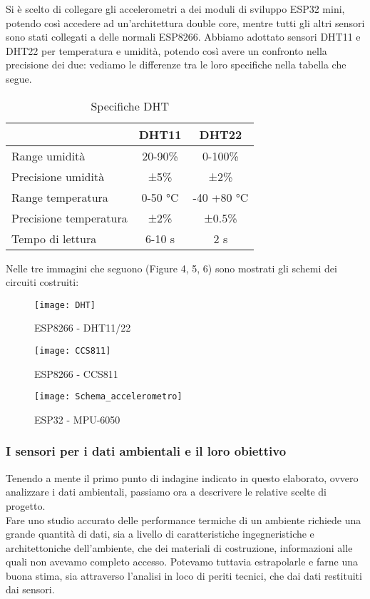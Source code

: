 \documentclass[fleqn,10pt]{SelfArx} %
\begin{document}
Si è scelto di collegare gli accelerometri a dei moduli di sviluppo ESP32 mini, potendo così accedere ad 
un'architettura double core, mentre tutti gli altri sensori sono stati collegati a delle normali ESP8266. 
Abbiamo adottato sensori DHT11 e DHT22 per temperatura e umidità, potendo così avere un confronto nella 
precisione dei due: vediamo le differenze tra le loro specifiche nella tabella che segue.

\begin{table}[hbt]
	\caption{Specifiche DHT}
	\centering
	\begin{tabular}{lcc}
		\toprule
			 & \textbf{DHT11} & \textbf{DHT22} \\
		\midrule
		Range umidità & 20-90\% & 0-100\% \\
		Precisione umidità & ±5\% & ±2\% \\
		Range temperatura & 0-50 °C & -40 +80 °C \\
		Precisione temperatura & ±2\% & ±0.5\% \\
		Tempo di lettura & 6-10 s & 2 s \\
		\bottomrule
	\end{tabular}
	\label{tab:label}
\end{table}

Nelle tre immagini che seguono (Figure 4, 5, 6) sono mostrati gli schemi dei circuiti costruiti: 

\begin{figure}[htb!]\centering
	\texttt{[image: DHT]}
	\caption{ESP8266 - DHT11/22}
	\label{fig:DHT11/22}
\end{figure}

\begin{figure}[htb!]\centering
	\texttt{[image: CCS811]}
	\caption{ESP8266 - CCS811}
	\label{fig:CCS811}
\end{figure}

\begin{figure}[htb!]\centering
	\texttt{[image: Schema\_accelerometro]}
	\caption{ESP32 - MPU-6050}
	\label{fig:MPU-6050}
\end{figure}

\subsubsection{I sensori per i dati ambientali e il loro obiettivo}
Tenendo a mente il primo punto di indagine indicato in questo elaborato, ovvero analizzare i dati ambientali, passiamo 
ora a descrivere le relative scelte di progetto.\\
Fare uno studio accurato delle performance termiche di un ambiente richiede una grande quantità di dati, sia a livello 
di caratteristiche ingegneristiche e architettoniche dell'ambiente, che dei materiali di costruzione, informazioni 
alle quali non avevamo completo accesso. Potevamo tuttavia estrapolarle e farne una buona stima, sia attraverso 
l'analisi in loco di periti tecnici, che dai dati restituiti dai sensori.\\
\end{document}
